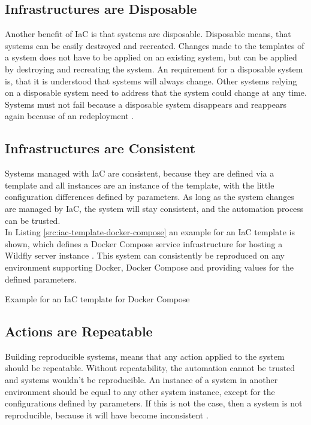 \subsection{Infrastructures are Disposable}
\label{sec:iac-principles-disposable}
Another benefit of IaC is that systems are disposable. Disposable means, that systems can be easily destroyed and recreated. Changes made to the templates of a system does not have to be applied on an existing system, but can be applied by destroying and recreating the system. An requirement for a disposable system is, that it is understood that systems will always change. Other systems relying on a disposable system need to address that the system could change at any time. Systems must not fail because a disposable system disappears and reappears again because of an redeployment \cite{Morris2016}.

\subsection{Infrastructures are Consistent}
\label{sec:iac-principles-consistency}
Systems managed with IaC are consistent, because they are defined via a template and all instances are an instance of the template, with the little configuration differences defined by parameters. As long as the system changes are managed by IaC, the system will stay consistent, and the automation process can be trusted. \\

In Listing \vref{src:iac-template-docker-compose} an example for an IaC template is shown, which defines a Docker Compose service infrastructure for hosting a Wildfly server instance \cite{Wildfly2017, DockerCompose2018}. This system can consistently be reproduced on any environment supporting Docker, Docker Compose and providing values for the defined parameters. \\

\begin{code}
	\caption{Example for an IaC template for Docker Compose}
	\label{src:iac-template-docker-compose}
\end{code}

\subsection{Actions are Repeatable}
\label{sec:iac-principles-repeatability}
Building reproducible systems, means that any action applied to the system should be repeatable. Without repeatability, the automation cannot be trusted and systems wouldn't be reproducible. An instance of a system in another environment should be equal to any other system instance, except for the configurations defined by parameters. If this is not the case, then a system is not reproducible, because it will have become inconsistent \cite{Morris2016}. \\

